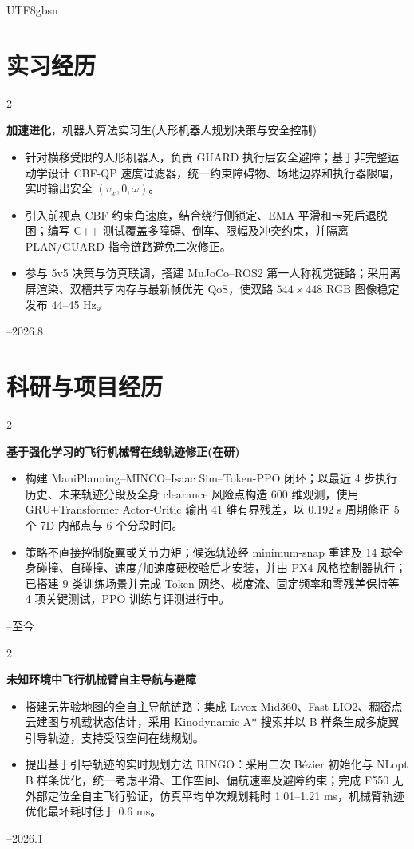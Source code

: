 \documentclass[10pt, letterpaper]{article}
\newenvironment{highlights}{
  \begin{itemize}[
    topsep=0.02 cm,
    parsep=0pt,
    partopsep=0pt,
    itemsep=0pt,
    leftmargin=0.4 cm + 8pt
  ]
}{
  \end{itemize}
}
\newenvironment{twocolentry}[2][]{
  \onecolentry
  \def\secondColumn{#2}
  \setcolumnwidth{\fill, 3.5 cm}
  \begin{paracol}{2}
}{
  \switchcolumn\raggedleft\secondColumn
  \end{paracol}
  \endonecolentry
}
\begin{document}
\begin{CJK*}{UTF8}{gbsn}
\section{实习经历}
\begin{twocolentry}{2026.7--2026.8}
  \textbf{加速进化}，机器人算法实习生(人形机器人规划决策与安全控制)
  \begin{highlights}
    \item 针对横移受限的人形机器人，负责 GUARD 执行层安全避障；基于非完整运动学设计 CBF-QP 速度过滤器，统一约束障碍物、场地边界和执行器限幅，实时输出安全 $(v_x,0,\omega)$。
    \item 引入前视点 CBF 约束角速度，结合绕行侧锁定、EMA 平滑和卡死后退脱困；编写 C++ 测试覆盖多障碍、倒车、限幅及冲突约束，并隔离 PLAN/GUARD 指令链路避免二次修正。
    \item 参与 5v5 决策与仿真联调，搭建 MuJoCo--ROS2 第一人称视觉链路；采用离屏渲染、双槽共享内存与最新帧优先 QoS，使双路 $544\times448$ RGB 图像稳定发布 44--45 Hz。
  \end{highlights}
\end{twocolentry}

\vspace{-0.22 cm}
\section{科研与项目经历}
\begin{twocolentry}{2026.3--至今}
  \textbf{基于强化学习的飞行机械臂在线轨迹修正(在研)}
  \begin{highlights}
    \item 构建 ManiPlanning--MINCO--Isaac Sim--Token-PPO 闭环；以最近 4 步执行历史、未来轨迹分段及全身 clearance 风险点构造 600 维观测，使用 GRU+Transformer Actor-Critic 输出 41 维有界残差，以 0.192 s 周期修正 5 个 7D 内部点与 6 个分段时间。
    \item 策略不直接控制旋翼或关节力矩；候选轨迹经 minimum-snap 重建及 14 球全身碰撞、自碰撞、速度/加速度硬校验后才安装，并由 PX4 风格控制器执行；已搭建 9 类训练场景并完成 Token 网络、梯度流、固定频率和零残差保持等 4 项关键测试，PPO 训练与评测进行中。
  \end{highlights}
\end{twocolentry}

\begin{twocolentry}{2025.3--2026.1}
  \textbf{未知环境中飞行机械臂自主导航与避障}
  \begin{highlights}
    \item 搭建无先验地图的全自主导航链路：集成 Livox Mid360、Fast-LIO2、稠密点云建图与机载状态估计，采用 Kinodynamic A* 搜索并以 B 样条生成多旋翼引导轨迹，支持受限空间在线规划。
    \item 提出基于引导轨迹的实时规划方法 RINGO：采用二次 B\'{e}zier 初始化与 NLopt B 样条优化，统一考虑平滑、工作空间、偏航速率及避障约束；完成 F550 无外部定位全自主飞行验证，仿真平均单次规划耗时 1.01--1.21 ms，机械臂轨迹优化最坏耗时低于 0.6 ms。
  \end{highlights}
\end{twocolentry}


\end{CJK*}
\end{document}
